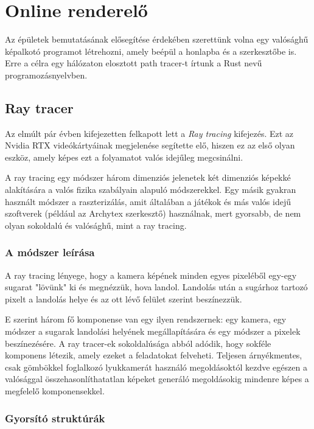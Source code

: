 \section{Online renderelő}
\label{raytracer}

Az épületek bemutatásának elősegítése érdekében szerettünk volna egy valósághű képalkotó programot létrehozni, amely beépül a honlapba és a szerkesztőbe is. Erre a célra egy hálózaton elosztott path tracer-t írtunk a Rust nevű programozásnyelvben.

\subsection{Ray tracer}
Az elmúlt pár évben kifejezetten felkapott lett a \emph{Ray tracing} kifejezés. Ezt az Nvidia RTX videókártyáinak megjelenése segítette elő, hiszen ez az első olyan eszköz, amely képes ezt a folyamatot valós idejűleg megcsinálni.

A ray tracing egy módszer három dimenziós jelenetek két dimenziós képekké alakítására a valós fizika szabályain alapuló módszerekkel. Egy másik gyakran használt módszer a raszterizálás, amit általában a játékok és más valós idejű szoftverek (például az Archytex szerkesztő) használnak, mert gyorsabb, de nem olyan sokoldalú és valósághű, mint a ray tracing.

\subsubsection{A módszer leírása}
A ray tracing lényege, hogy a kamera képének minden egyes pixeléből egy-egy sugarat "lövünk" ki és megnézzük, hova landol. Landolás után a sugárhoz tartozó pixelt a landolás helye és az ott lévő felület szerint beszínezzük.

E szerint három fő komponense van egy ilyen rendszernek: egy kamera, egy módszer a sugarak landolási helyének megállapítására és egy módszer a pixelek beszínezésére. A ray tracer-ek sokoldalúsága abból adódik, hogy sokféle komponens létezik, amely ezeket a feladatokat felveheti. Teljesen árnyékmentes, csak gömbökkel foglalkozó lyukkamerát használó megoldásoktól kezdve egészen a valósággal összehasonlíthatatlan képeket generáló megoldásokig mindenre képes a megfelelő komponensekkel.

\subsubsection{Gyorsító struktúrák}

